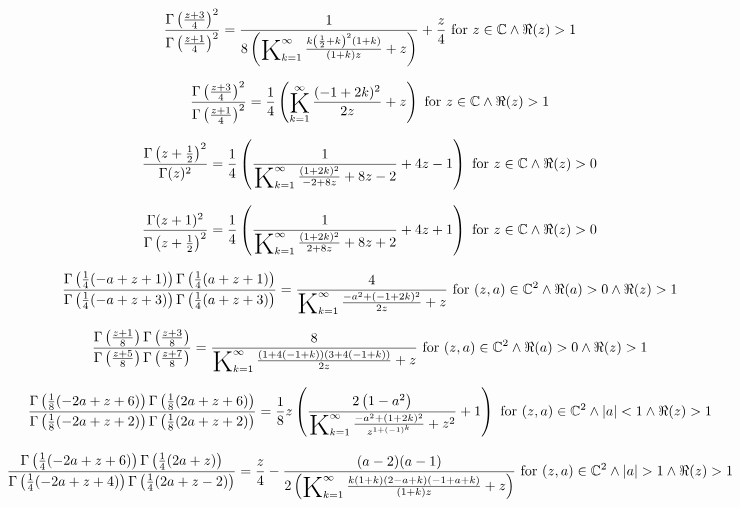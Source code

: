 \documentclass{article}
\newcommand{\bigK}{\mathop{\raisebox{-5pt}{\huge K}}}
\begin{document}
\[\frac{\Gamma \left(\frac{z+3}{4}\right)^2}{\Gamma \left(\frac{z+1}{4}\right)^2}=\frac{1}{8 \left(\bigK_{k=1}^{\infty}\frac{k \left(\frac{1}{2}+k\right)^2 (1+k)}{(1+k) z}+z\right)}+\frac{z}{4}\text{ for }z\in \mathbb{C}\land \Re(z)>1\] 

\[\frac{\Gamma \left(\frac{z+3}{4}\right)^2}{\Gamma \left(\frac{z+1}{4}\right)^2}=\frac{1}{4} \left(\bigK_{k=1}^{\infty}\frac{(-1+2 k)^2}{2 z}+z\right)\text{ for }z\in \mathbb{C}\land \Re(z)>1\] 

\[\frac{\Gamma \left(z+\frac{1}{2}\right)^2}{\Gamma (z)^2}=\frac{1}{4} \left(\frac{1}{\bigK_{k=1}^{\infty}\frac{(1+2 k)^2}{-2+8 z}+8 z-2}+4 z-1\right)\text{ for }z\in \mathbb{C}\land \Re(z)>0\] 

\[\frac{\Gamma (z+1)^2}{\Gamma \left(z+\frac{1}{2}\right)^2}=\frac{1}{4} \left(\frac{1}{\bigK_{k=1}^{\infty}\frac{(1+2 k)^2}{2+8 z}+8 z+2}+4 z+1\right)\text{ for }z\in \mathbb{C}\land \Re(z)>0\] 

\[\frac{\Gamma \left(\frac{1}{4} (-a+z+1)\right) \Gamma \left(\frac{1}{4} (a+z+1)\right)}{\Gamma \left(\frac{1}{4} (-a+z+3)\right) \Gamma \left(\frac{1}{4} (a+z+3)\right)}=\frac{4}{\bigK_{k=1}^{\infty}\frac{-a^2+(-1+2 k)^2}{2 z}+z}\text{ for }(z,a)\in \mathbb{C}^2\land \Re(a)>0\land \Re(z)>1\] 

\[\frac{\Gamma \left(\frac{z+1}{8}\right) \Gamma \left(\frac{z+3}{8}\right)}{\Gamma \left(\frac{z+5}{8}\right) \Gamma \left(\frac{z+7}{8}\right)}=\frac{8}{\bigK_{k=1}^{\infty}\frac{(1+4 (-1+k)) (3+4 (-1+k))}{2 z}+z}\text{ for }(z,a)\in \mathbb{C}^2\land \Re(a)>0\land \Re(z)>1\] 

\[\frac{\Gamma \left(\frac{1}{8} (-2 a+z+6)\right) \Gamma \left(\frac{1}{8} (2 a+z+6)\right)}{\Gamma \left(\frac{1}{8} (-2 a+z+2)\right) \Gamma \left(\frac{1}{8} (2 a+z+2)\right)}=\frac{1}{8} z \left(\frac{2 \left(1-a^2\right)}{\bigK_{k=1}^{\infty}\frac{-a^2+(1+2 k)^2}{z^{1+(-1)^k}}+z^2}+1\right)\text{ for }(z,a)\in \mathbb{C}^2\land \left| a\right| <1\land \Re(z)>1\] 

\[\frac{\Gamma \left(\frac{1}{4} (-2 a+z+6)\right) \Gamma \left(\frac{1}{4} (2 a+z)\right)}{\Gamma \left(\frac{1}{4} (-2 a+z+4)\right) \Gamma \left(\frac{1}{4} (2 a+z-2)\right)}=\frac{z}{4}-\frac{(a-2) (a-1)}{2 \left(\bigK_{k=1}^{\infty}\frac{k (1+k) (2-a+k) (-1+a+k)}{(1+k) z}+z\right)}\text{ for }(z,a)\in \mathbb{C}^2\land \left| a\right| >1\land \Re(z)>1\] 
\end{document}
